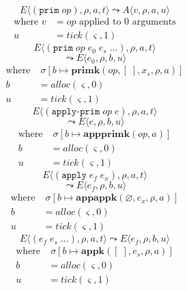 \documentclass[12pt,draft]{article}
\newcommand{\primsyn}[2]{(\texttt{prim}\;#1\;#2\;...)}
\newcommand{\singleprimsyn}[1]{(\texttt{prim}\;#1)}
\newcommand{\applyprimsyn}[2]{(\texttt{apply-prim}\;#1\;#2)}
\newcommand{\applysyn}[2]{(\texttt{apply}\;#1\;#2)}
\begin{document}
\begin{multicols*}{2}
\vspace{-5mm}
\[
E\langle
\singleprimsyn{op} , \rho , a , t
\rangle
\leadsto
A\langle
v , \rho , a , u
\rangle
\]
\vspace{-13mm}
\begin{align*}
\text{where } v &= op \text{ applied to } 0 \text{ arguments} \\
u &= tick(\varsigma, 1)
\end{align*}
\vspace{-5mm}
\[
E\langle
\primsyn{op}{e_0\;e_s} , \rho , a , t
\rangle
\]
\vspace{-7mm}
\[
\leadsto
E\langle
e_0 , \rho , b , u
\rangle
\]
\vspace{-10mm}
\begin{align*}
\text{where}&\; \sigma[b \mapsto \textbf{primk}(op, [\;], x_s, \rho, a)] \\
b &= alloc(\varsigma, 0) \\
u &= tick(\varsigma, 1)
\end{align*}
\vspace{-5mm}
\[
E\langle
\applyprimsyn{op}{e} , \rho , a , t
\rangle
\]
\vspace{-7mm}
\[
\leadsto
E\langle
e , \rho , b , u
\rangle
\]
\vspace{-12mm}
\begin{align*}
\text{where}&\; \sigma[b \mapsto \textbf{appprimk}(op, a)] \\
b &= alloc(\varsigma, 0) \\
u &= tick(\varsigma, 1)
\end{align*}
\vspace{-5mm}
\[
E\langle
\applysyn{e_f}{e_x} , \rho , a , t
\rangle
\]
\vspace{-8mm}
\[
\leadsto
E\langle
e_f , \rho , b , u
\rangle
\]
\vspace{-11mm}
\begin{align*}
\text{where}&\; \sigma[b \mapsto \textbf{appappk}(\varnothing , 
												e_x , \rho, a)] \\
b &= alloc(\varsigma, 0) \\
u &= tick(\varsigma, 1)
\end{align*}
\vspace{-5mm}
\[
E\langle
(e_f\;e_s\;...) , \rho , a , t
\rangle
\leadsto
E\langle
e_f , \rho , b , u
\rangle
\]
\vspace{-11mm}
\begin{align*}
\text{where}&\; \sigma[b \mapsto \textbf{appk}([\;],  e_s , \rho, a)] \\
b &= alloc(\varsigma, 0) \\
u &= tick(\varsigma, 1)
\end{align*}
\end{multicols*}
\end{document}
